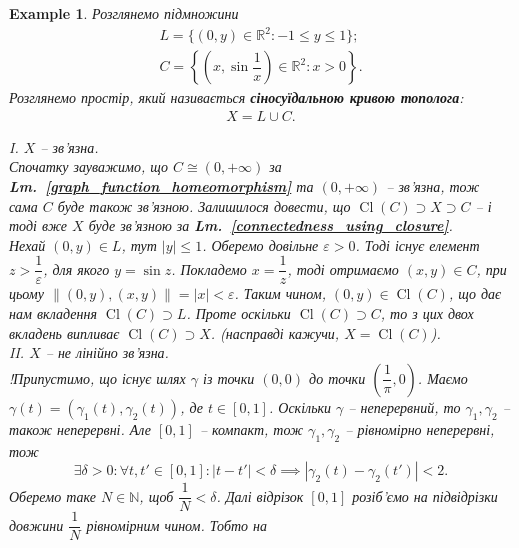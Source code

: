 \documentclass[a4paper, 10pt]{article}
\theoremstyle{theoremdd}
\newtheorem{example}[theorem]{Example}
\newcommand\lmref[1]{\textbf{Lm.~\ref{#1}}}
\DeclareMathOperator{\Cl}{Cl}
\begin{document}
\begin{example}
Розглянемо підмножини
\begin{gather*}
L = \{(0,y) \in \mathbb{R}^2 : -1 \leq y \leq 1\}; \\
C = \left\{ \left(x, \sin \dfrac{1}{x} \right) \in \mathbb{R}^2 : x > 0 \right\}.
\end{gather*}
Розглянемо простір, який називається \textbf{сіносуїдальною кривою тополога}:
\begin{align*}
X = L \cup C.
\end{align*}

I. \textit{$X$ -- зв'язна.}\\
Спочатку зауважимо, що $C \cong (0,+\infty)$ за \lmref{graph_function_homeomorphism} та $(0,+\infty)$ -- зв'язна, тож сама $C$ буде також зв'язною. Залишилося довести, що $\Cl(C) \supset X \supset C$ -- і тоді вже $X$ буде зв'язною за \lmref{connectedness_using_closure}.\\
Нехай $(0,y) \in L$, тут $|y| \leq 1$. Оберемо довільне $\varepsilon > 0$. Тоді існує елемент $z > \dfrac{1}{\varepsilon}$, для якого $y = \sin z$. Покладемо $x = \dfrac{1}{z}$, тоді отримаємо $(x,y) \in C$, при цьому $\| (0,y), (x,y) \| = |x| < \varepsilon$. Таким чином, $(0,y) \in \Cl(C)$, що дає нам вкладення $\Cl(C) \supset L$. Проте оскільки $\Cl(C) \supset C$, то з цих двох вкладень випливає $\Cl(C) \supset X$. (насправді кажучи, $X = \Cl(C)$).
\bigskip \\
II. \textit{$X$ -- не лінійно зв'язна.}\\
!Припустимо, що існує шлях $\gamma$ із точки $(0,0)$ до точки $\left( \dfrac{1}{\pi}, 0 \right)$. Маємо $\gamma(t) = (\gamma_1(t),\gamma_2(t))$, де $t \in [0,1]$. Оскільки $\gamma$ -- неперервний, то $\gamma_1,\gamma_2$ -- також неперервні. Але $[0,1]$ -- компакт, тож $\gamma_1,\gamma_2$ -- рівномірно неперервні, тож 
\[
\exists \delta > 0: \forall t,t' \in [0,1]: |t-t'| < \delta \implies |\gamma_2(t) - \gamma_2(t')| < 2.
\]
Оберемо таке $N \in \mathbb{N}$, щоб $\dfrac{1}{N} < \delta$. Далі відрізок $[0,1]$ розіб'ємо на підвідрізки довжини $\dfrac{1}{N}$ рівномірним чином. Тобто на 

\end{example}
\end{document}
